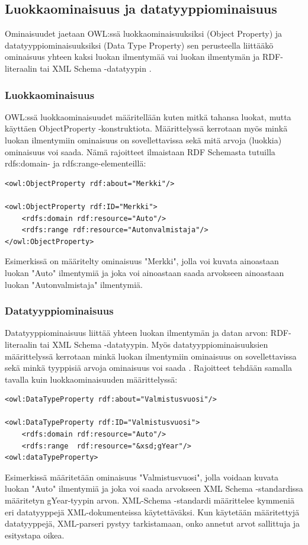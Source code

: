 \documentclass[finnish]{tktltiki2}
\theoremstyle{definition}
\theoremstyle{remark}
\begin{document}
\subsection{Luokkaominaisuus ja datatyyppiominaisuus}
Ominaisuudet jaetaan OWL:ssä luokkaominaisuuksiksi (Object Property) ja datatyyppiominaisuuksiksi (Data Type Property) sen perusteella liittääkö ominaisuus yhteen kaksi luokan ilmentymää vai luokan ilmentymän ja RDF-literaalin tai XML Schema -datatyypin  \cite{SWM04}. 
\subsubsection{Luokkaominaisuus}
OWL:ssä luokkaominaisuudet määritellään kuten mitkä tahansa luokat, mutta käyttäen ObjectProperty -konstruktiota. Määrittelyssä kerrotaan myös minkä luokan ilmentymiin ominaisuus on sovellettavissa sekä mitä arvoja (luokkia) ominaisuus voi saada. Nämä rajoitteet ilmaistaan RDF Schemasta tutuilla rdfs:domain- ja rdfs:range-elementeillä:
\begin{verbatim}
<owl:ObjectProperty rdf:about="Merkki"/>

<owl:ObjectProperty rdf:ID="Merkki">
    <rdfs:domain rdf:resource="Auto"/>
    <rdfs:range rdf:resource="Autonvalmistaja"/>
</owl:ObjectProperty>
\end{verbatim}
Esimerkissä on määritelty ominaisuus "Merkki", jolla voi kuvata ainoastaan luokan "Auto" ilmentymiä ja joka voi ainoastaan saada arvokseen ainoastaan luokan "Autonvalmistaja" ilmentymiä. 

\subsubsection{Datatyyppiominaisuus}
Datatyyppiominaisuus liittää yhteen luokan ilmentymän ja datan arvon: RDF-literaalin tai XML Schema -datatyypin. Myös datatyyppiominaisuuksien määrittelyssä kerrotaan minkä luokan ilmentymiin ominaisuus on sovellettavissa sekä minkä tyyppisiä arvoja ominaisuus voi saada \cite{SWM04}. Rajoitteet tehdään samalla tavalla kuin luokkaominaisuuden määrittelyssä:
\begin{verbatim}
<owl:DataTypeProperty rdf:about="Valmistusvuosi"/>

<owl:DataTypeProperty rdf:ID="Valmistusvuosi">
    <rdfs:domain rdf:resource="Auto"/>
    <rdfs:range  rdf:resource="&xsd;gYear"/>   
<owl:dataTypeProperty>
\end{verbatim}
Esimerkissä määritetään ominaisuus "Valmistusvuosi", jolla voidaan kuvata luokan "Auto" ilmentymiä ja joka voi saada arvokseen XML Schema -standardissa määritetyn gYear-tyypin arvon. XML-Schema -standardi määrittelee kymmeniä eri datatyyppejä XML-dokumenteissa käytettäväksi. Kun käytetään määritettyjä datatyyppejä, XML-parseri pystyy tarkistamaan, onko annetut arvot sallittuja ja esitystapa oikea.  
\end{document}

